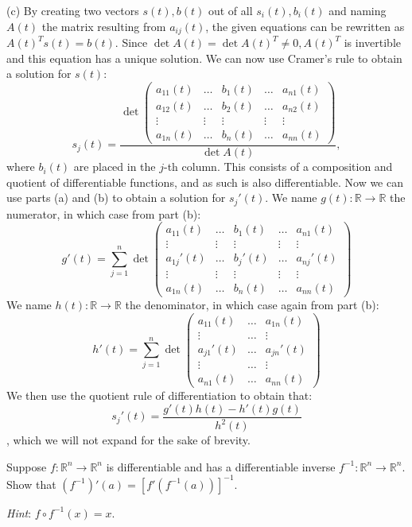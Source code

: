 (c) By creating two vectors $s(t), b(t)$ out of all $s_i(t), b_i(t)$ and naming $A(t)$ the matrix resulting from $a_{ij}(t)$, the given equations can be rewritten as $A(t)^Ts(t) = b(t)$. Since $\det A(t) = \det A(t)^T \neq 0, A(t)^T$ is invertible and this equation has a unique solution.
We can now use Cramer's rule to obtain a solution for $s(t)$:
$$s_j(t) = \frac{\det \begin{pmatrix}
    a_{11}(t) & \ldots & b_1(t) & \ldots & a_{n1}(t) \\
    a_{12}(t) & \ldots & b_2(t) & \ldots & a_{n2}(t) \\
    \vdots & \vdots & \vdots & \vdots & \vdots \\
    a_{1n}(t) & \ldots & b_n(t) & \ldots & a_{nn}(t)
\end{pmatrix}}{\det A(t)},$$
where $b_i(t)$ are placed in the $j$-th column.
This consists of a composition and quotient of differentiable functions, and as such is also differentiable.
Now we can use parts (a) and (b) to obtain a solution for $s_j'(t)$.
We name $g(t) : \mathbb{R} \rightarrow \mathbb{R}$ the numerator, in which case from part (b):
$$g'(t) = \sum_{j=1}^{n} \det \begin{pmatrix}
    a_{11}(t) & \ldots & b_1(t) & \ldots & a_{n1}(t) \\
    \vdots & \vdots & \vdots & \vdots & \vdots \\
    a_{1j}'(t) & \ldots & b_{j}'(t) & \ldots & a_{nj}'(t) \\
    \vdots & \vdots & \vdots & \vdots & \vdots \\
    a_{1n}(t) & \ldots & b_n(t) & \ldots & a_{nn}(t)
\end{pmatrix}$$
We name $h(t): \mathbb{R} \rightarrow \mathbb{R}$ the denominator, in which case again from part (b):
$$h'(t) = \sum_{j=1}^{n} \det \begin{pmatrix}
    a_{11}(t) & \ldots & a_{1n}(t) \\
    \vdots & \ldots & \vdots \\
    a_{j1}'(t) & \ldots & a_{jn}'(t) \\
    \vdots & \ldots & \vdots \\
    a_{n1}(t) & \ldots & a_{nn}(t)
\end{pmatrix}$$
We then use the quotient rule of differentiation to obtain that:
$$s_j'(t) = \frac{g'(t)h(t) - h'(t)g(t)}{h^2(t)}$$,
which we will not expand for the sake of brevity.

\begin{exercise}{16}
    Suppose $f: \mathbb{R}^n \rightarrow \mathbb{R}^n$ is differentiable and has a differentiable inverse $f^{-1}: \mathbb{R}^n \rightarrow \mathbb{R}^n$.
    Show that $(f^{-1})'(a) = [f'(f^{-1}(a))]^{-1}$.

    \textit{Hint}: $f \circ f^{-1}(x) = x$.
\end{exercise}

